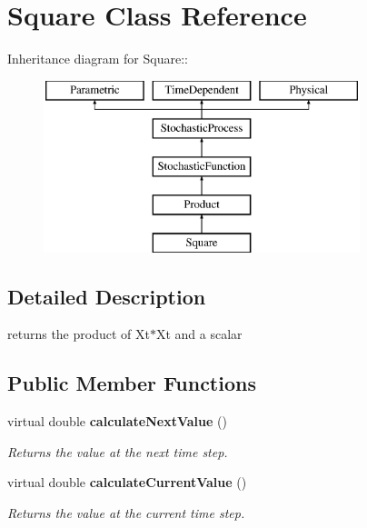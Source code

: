 \section{Square Class Reference}
\label{classSquare}
Inheritance diagram for Square::\begin{figure}[H]
\begin{center}
\leavevmode
\includegraphics[height=5cm]{classSquare}
\end{center}
\end{figure}


\subsection{Detailed Description}
returns the product of Xt$\ast$Xt and a scalar \subsection*{Public Member Functions}
\begin{CompactItemize}
\item 
virtual double {\bf calculateNextValue} ()\label{classSquare_b03010f31f1716e6ca06c05ad2442c95}

\begin{CompactList}\small\item\em Returns the value at the next time step. \item\end{CompactList}\item 
virtual double {\bf calculateCurrentValue} ()\label{classSquare_1235e02863dad7becef8e8fe04050e66}

\begin{CompactList}\small\item\em Returns the value at the current time step. \item\end{CompactList}\end{CompactItemize}
